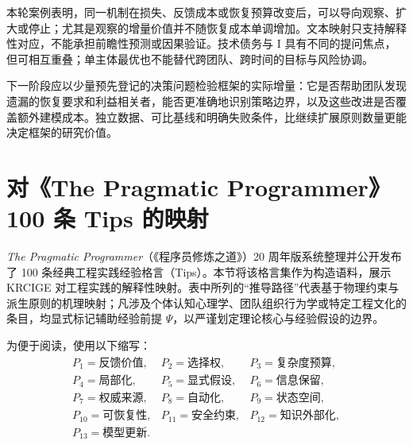 \documentclass[11pt,a4paper]{ctexart}
\numberwithin{equation}{section}
\theoremstyle{definition}
\theoremstyle{plain}
\newcommand{\PP}{\textit{The Pragmatic Programmer}}
\begin{document}
本轮案例表明，同一机制在损失、反馈成本或恢复预算改变后，可以导向观察、扩大或停止；尤其是观察的增量价值并不随恢复成本单调增加。文本映射只支持解释性对应，不能承担前瞻性预测或因果验证。技术债务与 I 具有不同的提问焦点，但可相互重叠；单主体最优也不能替代跨团队、跨时间的目标与风险协调。

下一阶段应以少量预先登记的决策问题检验框架的实际增量：它是否帮助团队发现遗漏的恢复要求和利益相关者，能否更准确地识别策略边界，以及这些改进是否覆盖额外建模成本。独立数据、可比基线和明确失败条件，比继续扩展原则数量更能决定框架的研究价值。

\appendix

\section{对《The Pragmatic Programmer》100 条 Tips 的映射}

\PP{}（《程序员修炼之道》）20 周年版系统整理并公开发布了 100 条经典工程实践经验格言（Tips）\cite{pragmatic2019,pragmatic2019tips}。本节将该格言集作为构造语料，展示 KRCIGE 对工程实践的解释性映射。表中所列的“推导路径”代表基于物理约束与派生原则的机理映射；凡涉及个体认知心理学、团队组织行为学或特定工程文化的条目，均显式标记辅助经验前提 $\Psi$，以严谨划定理论核心与经验假设的边界。

为便于阅读，使用以下缩写：
\[
\begin{array}{lll}
P_1=\text{反馈价值},&
P_2=\text{选择权},&
P_3=\text{复杂度预算},\\
P_4=\text{局部化},&
P_5=\text{显式假设},&
P_6=\text{信息保留},\\
P_7=\text{权威来源},&
P_8=\text{自动化},&
P_9=\text{状态空间},\\
P_{10}=\text{可恢复性},&
P_{11}=\text{安全约束},&
P_{12}=\text{知识外部化},\\
P_{13}=\text{模型更新}.&&
\end{array}
\]
\end{document}
